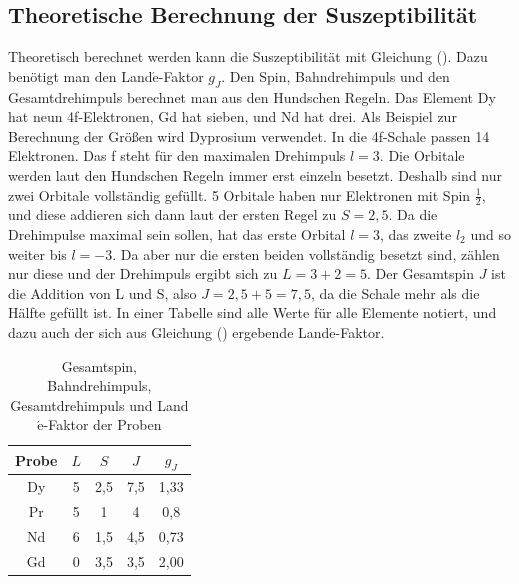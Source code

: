 \subsection{Theoretische Berechnung der Suszeptibilität}
Theoretisch berechnet werden kann die Suszeptibilität mit Gleichung (). Dazu benötigt man den Land$\acute{\text{e}}$-Faktor $g_J$. Den Spin, Bahndrehimpuls und den Gesamtdrehimpuls berechnet man aus den Hundschen Regeln.
Das Element Dy hat neun 4f-Elektronen, Gd hat sieben, und Nd hat drei. Als Beispiel zur Berechnung der Größen wird Dyprosium verwendet.
In die 4f-Schale passen 14 Elektronen. Das f steht für den maximalen Drehimpuls $l = 3$. 
Die Orbitale werden laut den Hundschen Regeln immer erst einzeln besetzt. Deshalb sind nur zwei Orbitale vollständig gefüllt. 5 Orbitale haben nur Elektronen mit Spin $\frac{1}{2}$, und diese addieren sich dann laut der ersten Regel zu $S= 2,5$.
Da die Drehimpulse maximal sein sollen, hat das erste Orbital $l=3$, das zweite $l_2$ und so weiter bis $l=-3$.
Da aber nur die ersten beiden vollständig besetzt sind, zählen nur diese und der Drehimpuls ergibt sich zu $L=3+2=5$.
Der Gesamtspin $J$ ist die Addition von L und S, also $J=2,5+5=7,5$, da die Schale mehr als die Hälfte gefüllt ist.
In einer Tabelle sind alle Werte für alle Elemente notiert, und dazu auch der sich aus Gleichung () ergebende Land$\acute{\text{e}}$-Faktor.
\begin{table}[H]
  \centering
  \caption{Gesamtspin, Bahndrehimpuls, Gesamtdrehimpuls und Land$\acute{\text{e}}$-Faktor der Proben}
  \label{tab:Dy}
  \begin{tabular}{c c c c c}
    \toprule
    Probe & $L$ & $S$ & $J$  & $g_J$  \\
    \midrule
    Dy & 5 & 2,5 & 7,5 & 1,33\\
    Pr & 5 & 1 & 4 & 0,8 \\
    Nd & 6 & 1,5 & 4,5 & 0,73\\
    Gd & 0 & 3,5 & 3,5 & 2,00\\
    \bottomrule
  \end{tabular}
\end{table}

